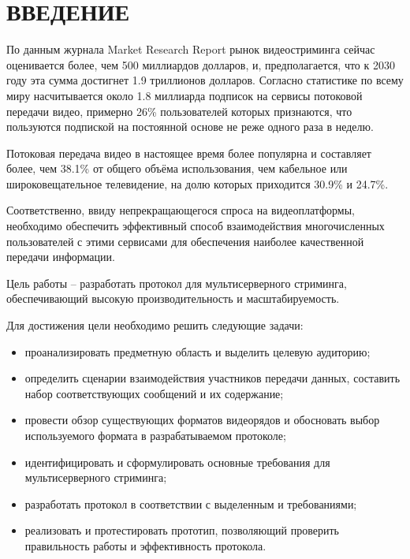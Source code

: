 \section*{ВВЕДЕНИЕ}
По данным журнала Market Research Report \cite{statistics} рынок видеостриминга сейчас оценивается более, чем 500 миллиардов долларов, и, предполагается, что к 2030 году эта сумма достигнет 1.9 триллионов долларов. Согласно статистике по всему миру насчитывается около 1.8 миллиарда подписок на сервисы потоковой передачи видео, примерно 26\% пользователей которых признаются, что пользуются подпиской на постоянной основе не реже одного раза в неделю. 

Потоковая передача видео в настоящее время более популярна и составляет более, чем 38.1\% от общего объёма использования, чем кабельное или широковещательное телевидение, на долю которых приходится 30.9\% и 24.7\%.

Соответственно, ввиду непрекращающегося спроса на видеоплатформы, необходимо обеспечить эффективный способ взаимодействия многочисленных пользователей с этими сервисами для обеспечения наиболее качественной передачи информации.

Цель работы -- разработать протокол для мультисерверного стриминга, обеспечивающий высокую производительность и масштабируемость.

Для достижения цели необходимо решить следующие задачи:
\begin{itemize}	
	\item проанализировать предметную область и выделить целевую аудиторию;
	
	\item определить сценарии взаимодействия участников передачи данных, составить набор соответствующих сообщений и их содержание;
	
	\item провести обзор существующих форматов видеорядов и обосновать выбор используемого формата в разрабатываемом протоколе;
	
	\item идентифицировать и сформулировать основные требования для мультисерверного стриминга;
	
	\item разработать протокол в соответствии с выделенным и требованиями;
	
	\item реализовать и протестировать прототип, позволяющий проверить правильность работы и эффективность протокола.
\end{itemize}

\pagebreak